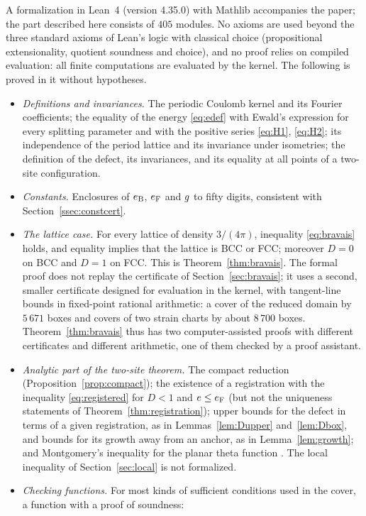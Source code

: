 A formalization in Lean~4 (version 4.35.0) with Mathlib accompanies the paper; the part described here consists of $405$
modules. No axioms are used beyond the three standard axioms of Lean's logic with classical choice (propositional
extensionality, quotient soundness and choice), and no proof relies on compiled evaluation: all finite computations are
evaluated by the kernel. The following is proved in it without hypotheses.
\begin{itemize}
\item \emph{Definitions and invariances.} The periodic Coulomb kernel and its Fourier coefficients; the equality of the energy
\eqref{eq:edef} with Ewald's expression for every splitting parameter and with the positive series \eqref{eq:H1}, \eqref{eq:H2}; its
independence of the period lattice and its invariance under isometries; the definition of the defect, its invariances, and its
equality at all points of a two-site configuration.
\item \emph{Constants.} Enclosures of $e_{\mathrm B}$, $e_{\mathrm F}$ and $g$ to fifty digits, consistent with Section~\ref{ssec:constcert}.
\item \emph{The lattice case.} For every lattice of density $3/(4\pi)$, inequality \eqref{eq:bravais} holds, and equality implies
that the lattice is BCC or FCC; moreover $D=0$ on BCC and $D=1$ on FCC. This is Theorem~\ref{thm:bravais}. The formal proof does not
replay the certificate of Section~\ref{sec:bravais}; it uses a second, smaller certificate designed for evaluation in the kernel,
with tangent-line bounds in fixed-point rational arithmetic: a cover of the reduced domain by $5\,671$ boxes and covers of two
strain charts by about $8\,700$ boxes. Theorem~\ref{thm:bravais} thus has two computer-assisted proofs with different certificates
and different arithmetic, one of them checked by a proof assistant.
\item \emph{Analytic part of the two-site theorem.} The compact reduction (Proposition~\ref{prop:compact}); the existence of a
registration with the inequality \eqref{eq:registered} for $D<1$ and $e\le e_{\mathrm F}$ (but not the uniqueness statements of
Theorem~\ref{thm:registration}); upper bounds for the defect in terms of a given registration, as in Lemmas~\ref{lem:Dupper}
and~\ref{lem:Dbox}, and bounds for its growth away from an anchor, as in Lemma~\ref{lem:growth}; and Montgomery's inequality for the
planar theta function \cite{Montgomery1988}. The local inequality of Section~\ref{sec:local} is not formalized.
\item \emph{Checking functions.} For most kinds of sufficient conditions used in the cover, a function with a proof of soundness:

\end{itemize}
